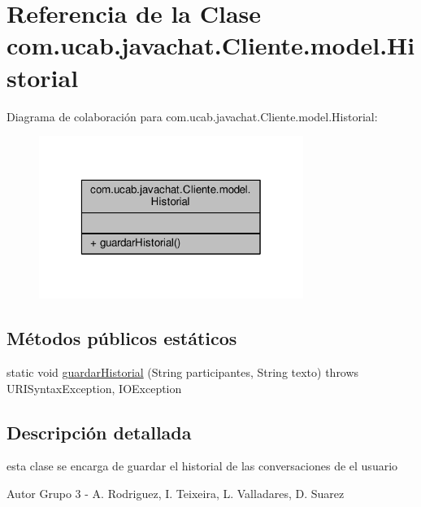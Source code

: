 \hypertarget{classcom_1_1ucab_1_1javachat_1_1_cliente_1_1model_1_1_historial}{\section{Referencia de la Clase com.\-ucab.\-javachat.\-Cliente.\-model.\-Historial}
\label{classcom_1_1ucab_1_1javachat_1_1_cliente_1_1model_1_1_historial}
}


Diagrama de colaboración para com.\-ucab.\-javachat.\-Cliente.\-model.\-Historial\-:\nopagebreak
\begin{figure}[H]
\begin{center}
\leavevmode
\includegraphics[width=244pt]{classcom_1_1ucab_1_1javachat_1_1_cliente_1_1model_1_1_historial__coll__graph}
\end{center}
\end{figure}
\subsection*{Métodos públicos estáticos}
\begin{DoxyCompactItemize}
\item 
static void \hyperlink{classcom_1_1ucab_1_1javachat_1_1_cliente_1_1model_1_1_historial_a725a59214e66a362a82a05a7b37cfb48}{guardar\-Historial} (String participantes, String texto)  throws U\-R\-I\-Syntax\-Exception, I\-O\-Exception 
\end{DoxyCompactItemize}


\subsection{Descripción detallada}
esta clase se encarga de guardar el historial de las conversaciones de el usuario \begin{DoxyAuthor}{Autor}
Grupo 3 -\/ A. Rodriguez, I. Teixeira, L. Valladares, D. Suarez 
\end{DoxyAuthor}



